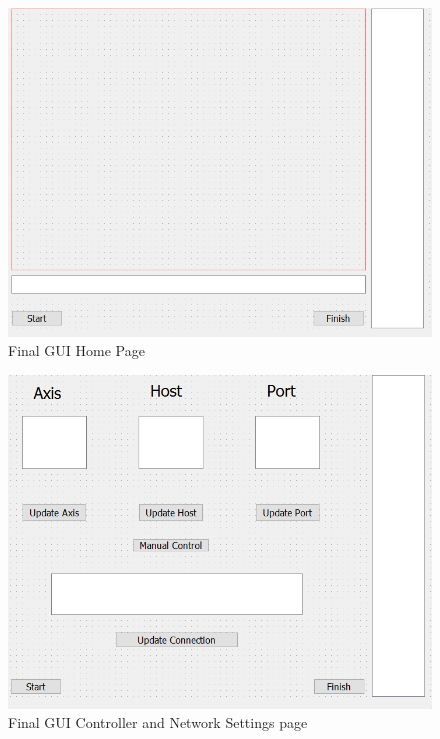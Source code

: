 \begin{figure}[H]
	\includegraphics[width=\linewidth]{Final_GUI_HOME.png}
	\caption{Final GUI Home Page}
	\label{fig:GUIHome}
\end{figure}
\begin{figure}[H]
	\includegraphics[width=\linewidth]{Final_GUI_CTRL.png}
	\caption{Final GUI Controller and Network Settings page}
	\label{fig:GUICtrl}
\end{figure}







